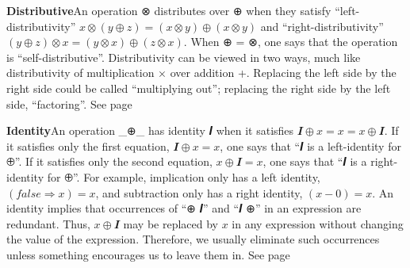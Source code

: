 \documentclass[11pt]{article}
\begin{document}
\vspace{1em}\textbf{Distributive}\quad\label{org-special-block-extras-glossary-Distributive}An operation ⊗ distributes over ⊕ when they satisfy “left-distributivity” $x ⊗ (y ⊕ z) = (x ⊗ y) ⊕ (x ⊗ y)$ and “right-distributivity” $(y ⊕ z) ⊗ x = (y ⊗ x) ⊕ (z ⊗ x)$.  When ⊕ = ⊗, one says that the operation is “self-distributive”.  Distributivity can be viewed in two ways, much like distributivity of multiplication × over addition +. Replacing the left side by the right side could be called “multiplying out”; replacing the right side by the left side, “factoring”. See page \pageref{org-special-block-extras-glossary-declaration-site-Distributive}

\vspace{1em}\textbf{Identity}\quad\label{org-special-block-extras-glossary-Identity}An operation _⊕_ has identity 𝑰 when it satisfies $𝑰 ⊕ x = x = x ⊕ 𝑰$.  If it satisfies only the first equation, $𝑰 ⊕ x = x$, one says that “𝑰 is a left-identity for ⊕”. If it satisfies only the second equation, $x ⊕ 𝑰 = x$, one says that “𝑰 is a right-identity for ⊕”.  For example, implication only has a left identity, $(false ⇒ x) = x$, and subtraction only has a right identity, $(x - 0) = x$.  An identity implies that occurrences of “⊕ 𝑰” and “𝑰 ⊕” in an expression are redundant. Thus, $x ⊕ 𝑰$ may be replaced by $x$ in any expression without changing the value of the expression. Therefore, we usually eliminate such occurrences unless something encourages us to leave them in. See page \pageref{org-special-block-extras-glossary-declaration-site-Identity}
\end{document}
